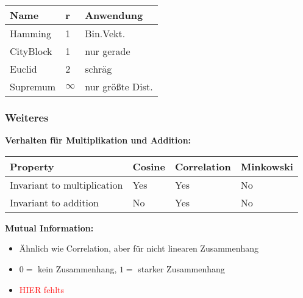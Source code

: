 \documentclass[a4paper]{article}
\begin{document}
\begin{landscape}
\begin{multicols}{3}
            \begin{center}
                
                \begin{tabular}{|l|l|l|}
                \hline
                Name      & r   & Anwendung                                                                                            \\ \hline
                Hamming   & 1   & Bin.Vekt. \\ \hline
                CityBlock & 1   &  nur gerade                                                                                                    \\ \hline
                Euclid    & 2   &  schräg                                                                                                    \\ \hline
                Supremum  & $\infty$ &  nur größte Dist.                                                                                                 \\ \hline
                \end{tabular}
            \end{center}

            \subsubsection{Weiteres}

            \textbf{Verhalten für Multiplikation und Addition:}
            \begin{center}
            \begin{tabular}{|l|l|l|l|}
                \hline
                Property                    & Cosine & Correlation & Minkowski \\ \hline
                Invariant to multiplication & Yes    & Yes         & No        \\ \hline
                Invariant to addition   & No     & Yes         & No        \\ \hline
                \end{tabular}
            \end{center}
        
            \textbf{Mutual Information:}
            \begin{itemize}[noitemsep,nolistsep]
                \item Ähnlich wie Correlation, aber für nicht linearen Zusammenhang
                \item $0 =$ kein Zusammenhang, $1 =$ starker Zusammenhang
                \item \textcolor{red}{HIER fehlts}
            \end{itemize}
            

\end{multicols}
\end{landscape}
\end{document}
